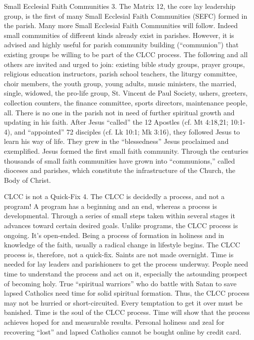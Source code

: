 \documentclass[oneside]{book}
\begin{document}
Small Ecclesial Faith Communities
3. The Matrix 12, the core lay leadership group, is the first of many Small
Ecclesial Faith Communities (SEFC) formed in the parish. Many more Small
Ecclesial Faith Communities will follow. Indeed small communities of different
kinds already exist in parishes. However, it is advised and highly useful for
parish community building (``communion'') that existing groups be willing to be
part of the CLCC process. The following and all others are invited and urged to
join: existing bible study groups, prayer groups, religious education
instructors, parish school teachers, the liturgy committee, choir members, the
youth group, young adults, music ministers, the married, single, widowed, the
pro-life group, St. Vincent de Paul Society, ushers, greeters, collection
counters, the finance committee, sports directors, maintenance people,
all. There is no one in the parish not in need of further spiritual growth and
updating in his faith. After Jesus ``called'' the 12 Apostles (cf. Mt 4:18,21;
10:1-4), and ``appointed'' 72 disciples (cf. Lk 10:1; Mk 3:16), they followed
Jesus to learn his way of life. They grew in the ``blessedness'' Jesus
proclaimed and exemplified. Jesus formed the first small faith
community. Through the centuries thousands of small faith communities have grown
into ``communions,'' called dioceses and parishes, which constitute the
infrastructure of the Church, the Body of Christ.

CLCC is not a Quick-Fix
4. The CLCC is decidedly a process, and not a program! A program has a beginning
and an end, whereas a process is developmental. Through a series of small steps
taken within several stages it advances toward certain desired goals. Unlike
programs, the CLCC process is ongoing. It's open-ended. Being a process of
formation in holiness and in knowledge of the faith, usually a radical change in
lifestyle begins. The CLCC process is, therefore, not a quick-fix. Saints are
not made overnight. Time is needed for lay leaders and parishioners to get the
process underway. People need time to understand the process and act on it,
especially the astounding prospect of becoming holy. True ``spiritual warriors''
who do battle with Satan to save lapsed Catholics need time for solid spiritual
formation. Thus, the CLCC process may not be hurried or short-circuited. Every
temptation to get it over must be banished. Time is the soul of the CLCC
process. Time will show that the process achieves hoped for and measurable
results. Personal holiness and zeal for recovering ``lost'' and lapsed Catholics
cannot be bought online by credit card.
\end{document}

